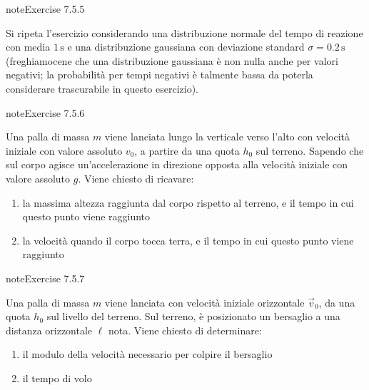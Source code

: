 \documentclass[letterpaper,10pt,italian]{jupyterBook}
\begin{document}
\begin{sphinxadmonition}{note}{Exercise 7.5.5}



\sphinxAtStartPar
Si ripeta l’esercizio considerando una distribuzione normale del tempo di reazione con media \(1 \, \text{s}\) e una distribuzione gaussiana con deviazione standard \(\sigma = 0.2 \, \text{s}\) (freghiamocene che una distribuzione gaussiana è non nulla anche per valori negativi; la probabilità per tempi negativi è talmente bassa da poterla considerare trascurabile in questo esercizio).
\end{sphinxadmonition}
 \label{exercise:ch/mechanics/kinematics-problems-exercise-5}

\begin{sphinxadmonition}{note}{Exercise 7.5.6}



\sphinxAtStartPar
Una palla di massa \(m\) viene lanciata lungo la verticale verso l’alto con velocità iniziale con valore assoluto \(v_0\), a partire da una quota \(h_0\) sul terreno. Sapendo che sul corpo agisce un’accelerazione in direzione opposta alla velocità iniziale con valore assoluto \(g\). Viene chiesto di ricavare:
\begin{enumerate}
%
\item {} 
\sphinxAtStartPar
la massima altezza raggiunta dal corpo rispetto al terreno, e il tempo in cui questo punto viene raggiunto

\item {} 
\sphinxAtStartPar
la velocità quando il corpo tocca terra, e il tempo in cui questo punto viene raggiunto

\end{enumerate}
\end{sphinxadmonition}
 \label{exercise:ch/mechanics/kinematics-problems-exercise-6}

\begin{sphinxadmonition}{note}{Exercise 7.5.7}



\sphinxAtStartPar
Una palla di massa \(m\) viene lanciata con velocità iniziale orizzontale \(\vec{v}_0\), da una quota \(h_0\) sul livello del terreno. Sul terreno, è posizionato un bersaglio a una distanza orizzontale \(\ell\) nota. Viene chiesto di determinare:
\begin{enumerate}
%
\item {} 
\sphinxAtStartPar
il modulo della velocità necessario per colpire il bersaglio

\item {} 
\sphinxAtStartPar
il tempo di volo

\end{enumerate}
\end{sphinxadmonition}
 \label{exercise:ch/mechanics/kinematics-problems-exercise-7}
\end{document}
